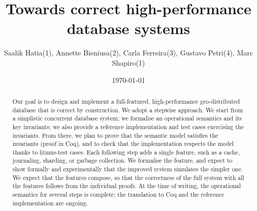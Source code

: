 \documentclass[systeme]{compas2022}
\begin{document}
\title{Towards correct high-performance database systems}

\author{Saalik Hatia(1), Annette Bieniusa(2), Carla Ferreira(3), Gustavo Petri(4), Marc Shapiro(1)}


\address{
  (1)~LIP6--Sorbonne-Université, Paris, France  \\
  (2)~TU Kaiserslautern, Germany \\
  (3)~Universidade NOVA de Lisboa, Portugal \\
  (4)~ARM, Cambridge, United Kingdom\\
  }

\date{\today}

\maketitle

\begin{abstract}
  Our goal is to design and implement a full-featured, high-performance
  geo-distributed database that is correct by construction.
  We adopt a stepwise approach.
  We start from a simplistic concurrent database system; we formalise an
  operational semantics and its key invariants; we also provide a
  reference implementation and test cases exercising the invariants.
  From there, we plan to prove that the semantic model satisfies the
  invariants (proof in Coq), and to check that the implementation respects
  the model thanks to litmus-test cases.
  Each following step adds a single feature, such as a cache, journaling,
  sharding, or garbage collection.
  We formalise the feature, and expect to show formally and experimentally
  that the improved system simulates the simpler one.
  We expect that the features compose, so that the correctness of the full
  system with all the features follows from the individual proofs.
  At the time of writing, the operational semantics for several steps is
  complete; the translation to Coq and the reference implementation are
  ongoing.

\end{abstract}

\tableofcontents

\end{document}
